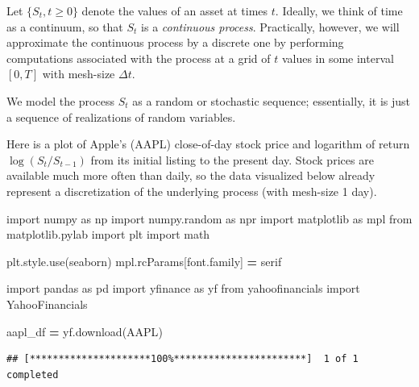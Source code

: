 \documentclass[
]{book}
\newenvironment{Shaded}{\begin{snugshade}}{\end{snugshade}}
\newcommand{\ImportTok}[1]{#1}
\newcommand{\NormalTok}[1]{#1}
\newcommand{\OperatorTok}[1]{\textcolor[rgb]{0.81,0.36,0.00}{\textbf{#1}}}
\newcommand{\StringTok}[1]{\textcolor[rgb]{0.31,0.60,0.02}{#1}}
\begin{document}
Let \(\{S_t, t\geq 0\}\) denote the values of an asset at times \(t\). Ideally, we think of time as a continuum, so that \(S_t\) is a \emph{continuous process}. Practically, however, we will approximate the continuous process by a discrete one by performing computations associated with the process at a grid of \(t\) values in some interval \([0,T]\) with mesh-size \(\Delta t\).

We model the process \(S_t\) as a random or stochastic sequence; essentially, it is just a sequence of realizations of random variables.

Here is a plot of Apple's (AAPL) close-of-day stock price and logarithm of return \(\log(S_t/S_{t-1})\) from its initial listing to the present day. Stock prices are available much more often than daily, so the data visualized below already represent a discretization of the underlying process (with mesh-size 1 day).

\begin{Shaded}
\begin{Highlighting}[]
\ImportTok{import}\NormalTok{ numpy }\ImportTok{as}\NormalTok{ np}
\ImportTok{import}\NormalTok{ numpy.random }\ImportTok{as}\NormalTok{ npr}
\ImportTok{import}\NormalTok{ matplotlib }\ImportTok{as}\NormalTok{ mpl}
\ImportTok{from}\NormalTok{ matplotlib.pylab }\ImportTok{import}\NormalTok{ plt }
\ImportTok{import}\NormalTok{ math}

\NormalTok{plt.style.use(}\StringTok{\textquotesingle{}seaborn\textquotesingle{}}\NormalTok{)}
\NormalTok{mpl.rcParams[}\StringTok{\textquotesingle{}font.family\textquotesingle{}}\NormalTok{] }\OperatorTok{=} \StringTok{\textquotesingle{}serif\textquotesingle{}}

\ImportTok{import}\NormalTok{ pandas }\ImportTok{as}\NormalTok{ pd}
\ImportTok{import}\NormalTok{ yfinance }\ImportTok{as}\NormalTok{ yf}
\ImportTok{from}\NormalTok{ yahoofinancials }\ImportTok{import}\NormalTok{ YahooFinancials}

\NormalTok{aapl\_df }\OperatorTok{=}\NormalTok{ yf.download(}\StringTok{\textquotesingle{}AAPL\textquotesingle{}}\NormalTok{)}
\end{Highlighting}
\end{Shaded}

\begin{verbatim}
## [*********************100%***********************]  1 of 1 completed
\end{verbatim}
\end{document}
